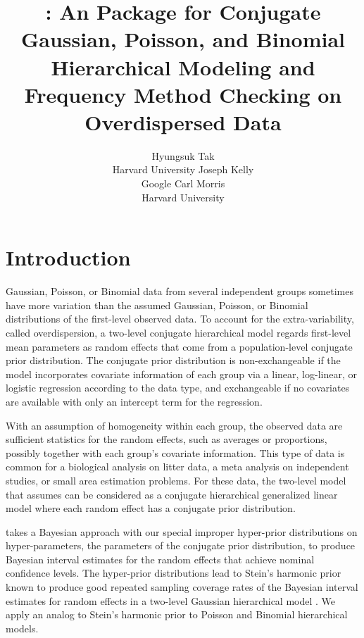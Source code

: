 \documentclass[article]{jss}
\author{Hyungsuk Tak\\Harvard University \And 
             Joseph Kelly\\Google\And
             Carl Morris\\ Harvard University}
\title{\pkg{Rgbp}: An \proglang{R} Package for Conjugate Gaussian, Poisson, and Binomial Hierarchical Modeling and Frequency Method Checking on Overdispersed Data}
\begin{document}

\section[Introduction]{Introduction}
Gaussian, Poisson, or Binomial data from several independent groups sometimes have more variation than the assumed Gaussian, Poisson, or Binomial distributions of the first-level observed data. To account for the extra-variability, called overdispersion, a  two-level conjugate hierarchical model regards first-level mean parameters as random effects that come from a population-level conjugate prior distribution. The conjugate prior distribution is non-exchangeable if the model incorporates covariate information of each group via a linear, log-linear, or logistic regression according to the data type, and exchangeable if no covariates are available with only an intercept term for the regression. 


With an assumption of homogeneity within each group, the observed data are sufficient statistics for the random effects, such as averages or proportions, possibly together with each group's covariate information. This type of  data is common for a biological analysis on litter data, a meta analysis on independent studies, or small area estimation problems.  For these data, the two-level model that  assumes can be considered as a conjugate hierarchical generalized linear model \citep{lee1996hierarchical, hglm2006} where each random effect has a conjugate prior distribution.


 takes a Bayesian approach with our special improper hyper-prior distributions on hyper-parameters, the parameters of the conjugate prior distribution, to produce  Bayesian interval   estimates for the random effects that achieve nominal confidence levels. The hyper-prior distributions lead to Stein's harmonic prior known to produce good repeated sampling coverage rates of the Bayesian interval estimates for random effects in a two-level Gaussian hierarchical model \citep{tang2011, morris2012, kelly2014advances}.  We apply an analog to Stein's harmonic prior to Poisson and Binomial hierarchical models. 
\end{document}
